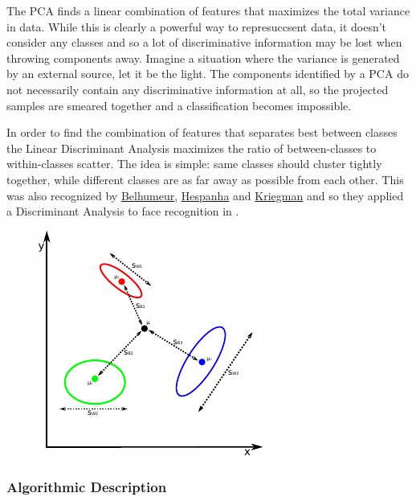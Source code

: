 The PCA finds a linear combination of features that maximizes the total variance in data. While this is clearly a powerful way to represuccsent data, it doesn't consider any classes and so a lot of discriminative information may be lost when throwing components away. Imagine a situation where the variance is generated by an external source, let it be the light. The components identified by a PCA do not necessarily contain any discriminative information at all, so the projected samples are smeared together and a classification becomes impossible.

In order to find the combination of features that separates best between classes the Linear Discriminant Analysis maximizes the ratio of between-classes to within-classes scatter. The idea is simple: same classes should cluster tightly together, while different classes are as far away as possible from each other. This was also recognized by \href{http://www.cs.columbia.edu/~belhumeur/}{Belhumeur}, \href{http://www.ece.ucsb.edu/~hespanha/}{Hespanha} and \href{http://cseweb.ucsd.edu/~kriegman/}{Kriegman} and so they applied a Discriminant Analysis to face recognition in \cite{belhumeru97}. 

\begin{figure}
	\begin{center}
		\includegraphics[scale=1.70]{img/fisherfaces/multiclasslda}
		\label{fig:scatter_matrices}
	\end{center}
\end{figure}

\subsubsection{Algorithmic Description}

